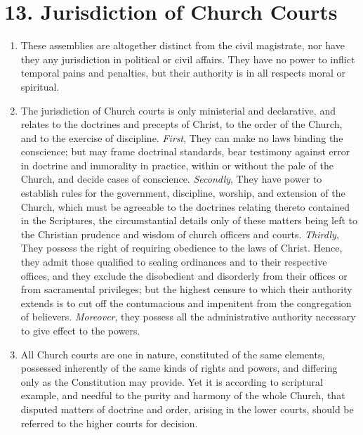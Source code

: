 \documentclass[
]{book}
\providecommand{\tightlist}{%
  \setlength{\itemsep}{0pt}\setlength{\parskip}{0pt}}
\begin{document}
\hypertarget{jurisdiction-of-church-courts}{%
\section*{13. Jurisdiction of Church Courts}\label{jurisdiction-of-church-courts}}

\protect\hypertarget{chapter-slug-13-jurisdiction-of-church-courts}{\href{}{}}

\begin{enumerate}
\def\labelenumi{\arabic{enumi}.}
\tightlist
\item
  \protect\hypertarget{13}{\href{}{}}These assemblies are altogether distinct from the civil magistrate, nor have they any jurisdiction in political or civil affairs. They have no power to inflict temporal pains and penalties, but their authority is in all respects moral or spiritual.
\item
  The jurisdiction of Church courts is only ministerial and declarative, and relates to the doctrines and precepts of Christ, to the order of the Church, and to the exercise of discipline. \emph{First}, They can make no laws binding the conscience; but may frame doctrinal standards, bear testimony against error in doctrine and immorality in practice, within or without the pale of the Church, and decide cases of conscience. \emph{Secondly}, They have power to establish rules for the government, discipline, worship, and extension of the Church, which must be agreeable to the doctrines relating thereto contained in the Scriptures, the circumstantial details only of these matters being left to the Christian prudence and wisdom of church officers and courts. \emph{Thirdly}, They possess the right of requiring obedience to the laws of Christ. Hence, they admit those qualified to sealing ordinances and to their respective offices, and they exclude the disobedient and disorderly from their offices or from sacramental privileges; but the highest censure to which their authority extends is to cut off the contumacious and impenitent from the congregation of believers. \emph{Moreover}, they possess all the administrative authority necessary to give effect to the powers.
\item
  All Church courts are one in nature, constituted of the same elements, possessed inherently of the same kinds of rights and powers, and differing only as the Constitution may provide. Yet it is according to scriptural example, and needful to the purity and harmony of the whole Church, that disputed matters of doctrine and order, arising in the lower courts, should be referred to the higher courts for decision.

\end{enumerate}
\end{document}
